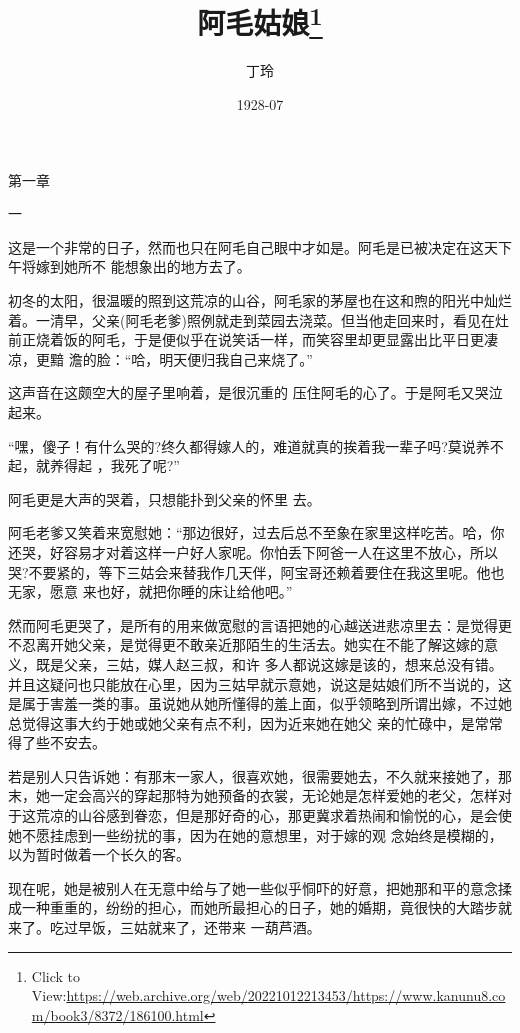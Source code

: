 \documentclass{article}
\title{阿毛姑娘\footnote{Click to View:\url{https://web.archive.org/web/20221012213453/https://www.kanunu8.com/book3/8372/186100.html}}}
\author{丁玲}
\date{1928-07}
\begin{document}

\maketitle


\Large


﻿第一章 


一 

这是一个非常的日子，然而也只在阿毛自己眼中才如是。阿毛是已被决定在这天下午将嫁到她所不
能想象出的地方去了。 

初冬的太阳，很温暖的照到这荒凉的山谷，阿毛家的茅屋也在这和煦的阳光中灿烂着。一清早，父亲(阿毛老爹)照例就走到菜园去浇菜。但当他走回来时，看见在灶前正烧着饭的阿毛，于是便似乎在说笑话一样，而笑容里却更显露出比平日更凄凉，更黯
澹的脸：“哈，明天便归我自己来烧了。” 

\newpage

这声音在这颇空大的屋子里响着，是很沉重的
压住阿毛的心了。于是阿毛又哭泣起来。 

“嘿，傻子！有什么哭的?终久都得嫁人的，难道就真的挨着我一辈子吗?莫说养不起，就养得起
，我死了呢?” 

阿毛更是大声的哭着，只想能扑到父亲的怀里
去。 

阿毛老爹又笑着来宽慰她：“那边很好，过去后总不至象在家里这样吃苦。哈，你还哭，好容易才对着这样一户好人家呢。你怕丢下阿爸一人在这里不放心，所以哭?不要紧的，等下三姑会来替我作几天伴，阿宝哥还赖着要住在我这里呢。他也无家，愿意
来也好，就把你睡的床让给他吧。” 

然而阿毛更哭了，是所有的用来做宽慰的言语把她的心越送进悲凉里去：是觉得更不忍离开她父亲，是觉得更不敢亲近那陌生的生活去。她实在不能了解这嫁的意义，既是父亲，三姑，媒人赵三叔，和许
\newpage
多人都说这嫁是该的，想来总没有错。并且这疑问也只能放在心里，因为三姑早就示意她，说这是姑娘们所不当说的，这是属于害羞一类的事。虽说她从她所懂得的羞上面，似乎领略到所谓出嫁，不过她总觉得这事大约于她或她父亲有点不利，因为近来她在她父
亲的忙碌中，是常常得了些不安去。 

若是别人只告诉她：有那末一家人，很喜欢她，很需要她去，不久就来接她了，那末，她一定会高兴的穿起那特为她预备的衣裳，无论她是怎样爱她的老父，怎样对于这荒凉的山谷感到眷恋，但是那好奇的心，那更冀求着热闹和愉悦的心，是会使她不愿挂虑到一些纷扰的事，因为在她的意想里，对于嫁的观
念始终是模糊的，以为暂时做着一个长久的客。 

现在呢，她是被别人在无意中给与了她一些似乎恫吓的好意，把她那和平的意念揉成一种重重的，纷纷的担心，而她所最担心的日子，她的婚期，竟很快的大踏步就来了。吃过早饭，三姑就来了，还带来
一葫芦酒。 
\end{document}

